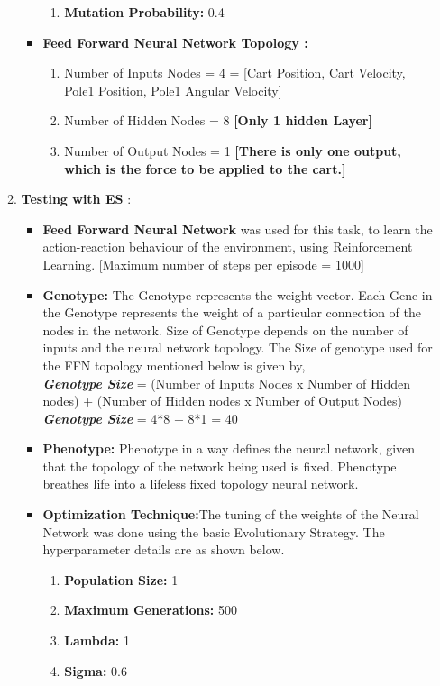 \documentclass{article}
\begin{document}
\begin{itemize}
\begin{enumerate}
\begin{itemize}
\begin{enumerate}
	\item \textbf{Mutation Probability:} 0.4
	\end{enumerate}
	\item \textbf{Feed Forward Neural Network Topology :}
	\begin{enumerate}
	\item Number of Inputs Nodes = 4 = [Cart Position, Cart Velocity, Pole1 Position, Pole1 Angular Velocity]
	\item Number of Hidden Nodes = 8 \textbf{[Only 1 hidden Layer]}
	\item Number of Output Nodes = 1 \textbf{[There is only one output, which is the force to be applied to the cart.]}
	\end{enumerate}
	\end{itemize}
	\item \textbf{Testing with ES} :
	\begin{itemize}
	\item \textbf{Feed Forward Neural Network} was used for this task, to learn the action-reaction behaviour of the environment, using Reinforcement Learning. [Maximum number of steps per episode = 1000]
	\item \textbf{Genotype:} The Genotype represents the weight vector. Each Gene in the Genotype represents the weight of a particular connection of the nodes in the network. Size of Genotype depends on the number of inputs and the neural network topology. The Size of genotype used for the FFN topology mentioned below is given by, \\
	\textit{\textbf{Genotype Size}} = (Number of Inputs Nodes x Number of Hidden nodes) + (Number of Hidden nodes x Number of Output Nodes)\\
	\textbf{\textit{Genotype Size}} = 4*8 + 8*1 = 40
	\item \textbf{Phenotype:} Phenotype in a way defines the neural network, given that the topology of the network being used is fixed. Phenotype breathes life into a lifeless fixed topology neural network.
	\item \textbf{Optimization Technique:}The tuning of the weights of the Neural Network was done using the basic Evolutionary Strategy. The hyperparameter details are as shown below.
	\begin{enumerate}
	\item \textbf{Population Size:} 1
	\item \textbf{Maximum Generations:} 500
	\item \textbf{Lambda:} 1
	\item \textbf{Sigma:} 0.6

\end{enumerate}
\end{itemize}
\end{enumerate}
\end{itemize}
\end{document}
